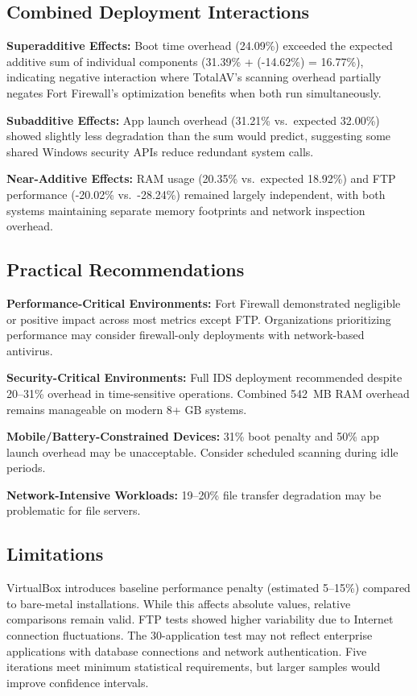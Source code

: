 \documentclass[runningheads,a4paper,english]{llncs}[2022/01/12]
\begin{document}
\subsection{Combined Deployment Interactions}

\textbf{Superadditive Effects:} Boot time overhead (24.09\%) exceeded the expected additive sum of individual components (31.39\% + (-14.62\%) = 16.77\%), indicating negative interaction where TotalAV's scanning overhead partially negates Fort Firewall's optimization benefits when both run simultaneously.

\textbf{Subadditive Effects:} App launch overhead (31.21\% vs.\ expected 32.00\%) showed slightly less degradation than the sum would predict, suggesting some shared Windows security APIs reduce redundant system calls.

\textbf{Near-Additive Effects:} RAM usage (20.35\% vs.\ expected 18.92\%) and FTP performance (-20.02\% vs.\ -28.24\%) remained largely independent, with both systems maintaining separate memory footprints and network inspection overhead.

\subsection{Practical Recommendations}

\textbf{Performance-Critical Environments:} Fort Firewall demonstrated negligible or positive impact across most metrics except FTP. Organizations prioritizing performance may consider firewall-only deployments with network-based antivirus.

\textbf{Security-Critical Environments:} Full IDS deployment recommended despite 20--31\% overhead in time-sensitive operations. Combined 542~MB RAM overhead remains manageable on modern 8+ GB systems.

\textbf{Mobile/Battery-Constrained Devices:} 31\% boot penalty and 50\% app launch overhead may be unacceptable. Consider scheduled scanning during idle periods.

\textbf{Network-Intensive Workloads:} 19--20\% file transfer degradation may be problematic for file servers.

\subsection{Limitations}

VirtualBox introduces baseline performance penalty (estimated 5--15\%) compared to bare-metal installations. While this affects absolute values, relative comparisons remain valid. FTP tests showed higher variability due to Internet connection fluctuations. The 30-application test may not reflect enterprise applications with database connections and network authentication. Five iterations meet minimum statistical requirements, but larger samples would improve confidence intervals.
\end{document}
